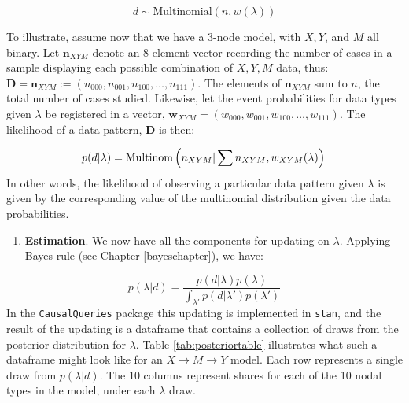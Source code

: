 \documentclass[
  12pt,
]{book}
\providecommand{\tightlist}{%
  \setlength{\itemsep}{0pt}\setlength{\parskip}{0pt}}
\begin{document}
\[d \sim \text{Multinomial}(n, w(\lambda))\]

To illustrate, assume now that we have a 3-node model, with \(X, Y\), and \(M\) all binary. Let \(\mathbf n_{XYM}\) denote an 8-element vector recording the number of cases in a sample displaying each possible combination of \(X,Y,M\) data, thus: \(\mathbf D= \mathbf n_{XYM}:=(n_{000},n_{001},n_{100},\dots ,n_{111})\). The elements of \(\mathbf n_{XYM}\) sum to \(n\), the total number of cases studied. Likewise, let the event probabilities for data types given \(\lambda\) be registered in a vector, \(\mathbf w_{XYM}=(w_{000},w_{001},w_{100},\dots ,w_{111})\). The likelihood of a data pattern, \(\mathbf D\) is then:

\[
p(d|\lambda) = 
  \text{Multinom}\left(n_{XYM}|\sum n_{XYM}, w_{XYM}(\lambda)\right)  \\
\]
In other words, the likelihood of observing a particular data pattern given \(\lambda\) is given by the corresponding value of the multinomial distribution given the data probabilities.

\begin{enumerate}
\def\labelenumi{\arabic{enumi}.}
\setcounter{enumi}{3}
\tightlist
\item
  \textbf{Estimation}. We now have all the components for updating on \(\lambda\). Applying Bayes rule (see Chapter \ref{bayeschapter}), we have:
\end{enumerate}

\[p(\lambda | d) = \frac{p(d | \lambda)p(\lambda)}{\int_{\lambda'}{p(d | \lambda')p(\lambda')}}\]
In the \texttt{CausalQueries} package this updating is implemented in \texttt{stan}, and the result of the updating is a dataframe that contains a collection of draws from the posterior distribution for \(\lambda\). Table \ref{tab:posteriortable} illustrates what such a dataframe might look like for an \(X\rightarrow M \rightarrow Y\) model. Each row represents a single draw from \(p(\lambda|d)\). The 10 columns represent shares for each of the 10 nodal types in the model, under each \(\lambda\) draw.
\end{document}
